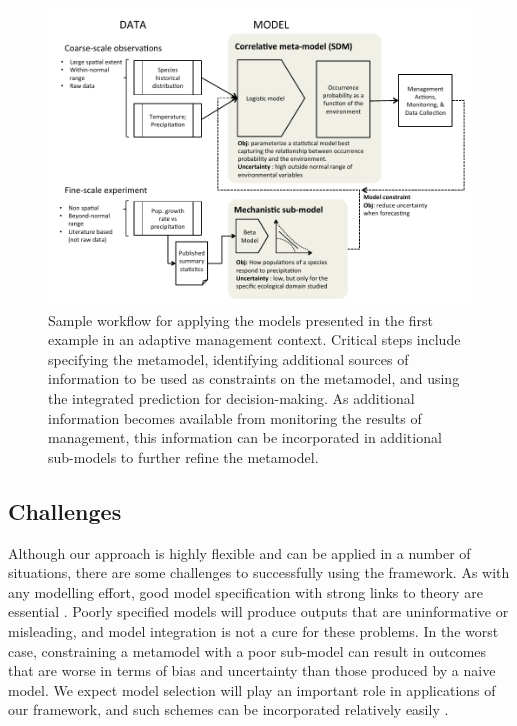 \begin{figure}[tb]
	\includegraphics{adaptive_management.pdf}
	\caption{Sample workflow for applying the models presented in the first example in an adaptive management context.
	Critical steps include specifying the metamodel, identifying additional sources of information to be used as constraints on the metamodel, and using the integrated prediction for decision-making.
	As additional information becomes available from monitoring the results of management, this information can be incorporated in additional sub-models to further refine the metamodel.}
	\label{fig:adaptive_management}
\end{figure}



\subsection*{Challenges} 
Although our approach is highly flexible and can be applied in a number of situations, there are some challenges to successfully using the framework.
As with any modelling effort, good model specification with strong links to theory are essential \citep{Austin2007}.
Poorly specified models will produce outputs that are uninformative or misleading, and model integration is not a cure for these problems.
In the worst case, constraining a metamodel with a poor sub-model can result in outcomes that are worse in terms of bias and uncertainty than those produced by a naive model.
We expect model selection will play an important role in applications of our framework, and such schemes can be incorporated relatively easily \citep{Madigan1995, Wasserman2000, Tenan2014}.

